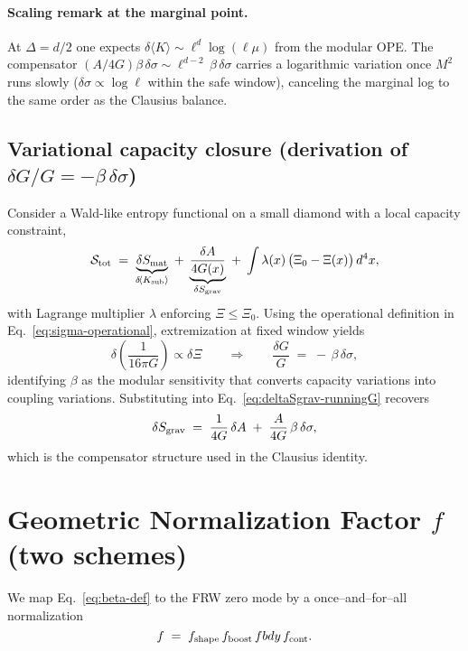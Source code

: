 \documentclass[aps,prd,onecolumn,superscriptaddress,nofootinbib]{revtex4-2}
\def\fbdy{fbdy}%
\newcommand{\fbdy}{f_{\rm bdy}}
\begin{document}
\paragraph*{Scaling remark at the marginal point.}
At \(\Delta=d/2\) one expects \(\delta\!\langle K\rangle\sim \ell^{d}\log(\ell\mu)\) from the modular OPE. The compensator \((A/4G)\beta\,\delta\sigma\sim \ell^{d-2}\,\beta\,\delta\sigma\) carries a logarithmic variation once \(M^2\) runs slowly (\(\delta\sigma\propto \log \ell\) within the safe window), canceling the marginal log to the same order as the Clausius balance.
\subsection{Variational capacity closure (derivation of \texorpdfstring{$\delta G/G = -\beta\,\delta\sigma$}{deltaG/G = -beta delta sigma})}
\label{sec:variational-closure}
\noindent Consider a Wald-like entropy functional on a small diamond with a local capacity constraint,
\begin{equation}
\mathcal{S}_{\rm tot} \;=\; \underbrace{\delta S_{\rm mat}}_{\delta\!\langle K_{\rm sub}\rangle} \;+\; \underbrace{\frac{\delta A}{4G(x)}}_{\delta S_{\rm grav}} \;+\; \int \lambda(x)\,\big(\Xi_0-\Xi(x)\big)\,d^4x,
\end{equation}
with Lagrange multiplier $\lambda$ enforcing $\Xi\le\Xi_0$. Using the operational definition in Eq.~\eqref{eq:sigma-operational}, extremization at fixed window yields
\begin{equation}
\delta\!\left(\frac{1}{16\pi G}\right) \propto \delta \Xi
\qquad\Rightarrow\qquad
\frac{\delta G}{G} \;=\; -\,\beta\,\delta \sigma,
\end{equation}
identifying $\beta$ as the modular sensitivity that converts capacity variations into coupling variations. Substituting into Eq.~\eqref{eq:deltaSgrav-runningG} recovers
\begin{equation}
\delta S_{\rm grav} \;=\; \frac{1}{4G}\,\delta A \;+\; \frac{A}{4G}\,\beta\,\delta\sigma,
\end{equation}
which is the compensator structure used in the Clausius identity.

\section{Geometric Normalization Factor \texorpdfstring{$f$}{f} (two schemes)}
\label{sec:f-norm}
We map Eq.~\eqref{eq:beta-def} to the FRW zero mode by a once–and–for–all normalization
\begin{equation}
f \;=\; f_{\rm shape}\, f_{\rm boost}\, \fbdy\, f_{\rm cont}.
\end{equation}
\end{document}
